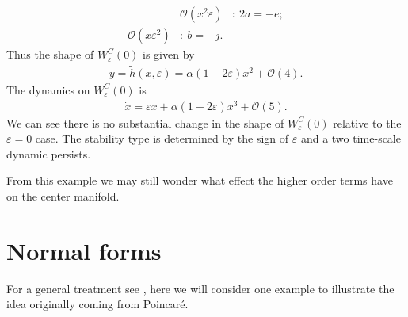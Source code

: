 \begin{ex}
\begin{subequations}
\begin{align}
		&\mathcal{O}(x^2\varepsilon)&:\ 2a=-e;\\
		\mathcal{O}(x\varepsilon^2)&:\ b=-j.
	\end{align}\end{subequations}
	Thus the shape of $W^{C}_{\varepsilon}(0)$ is given by 
	\begin{align}
		y = \tilde{h}(x,\varepsilon) = \alpha(1-2\varepsilon)x^2+ \mathcal{O}(4).
	\end{align}
	The dynamics on $W^{C}_{\varepsilon}(0)$ is
	\begin{align}
		\dot{x} = \varepsilon x + \alpha(1-2\varepsilon)x^3 + \mathcal{O}(5).
	\end{align}
	We can see there is no substantial change in the shape of $W^{C}_{\varepsilon}(0)$ relative to the $\varepsilon=0$ case. The stability type is determined by the sign of $\varepsilon$ and a two time-scale dynamic persists.	
\end{ex}
From this example we may still wonder what effect the higher order terms have on the center manifold.




\section{Normal forms}
For a general treatment see \cite{GuckenheimerHolmes}, here we will consider one example to illustrate the idea originally coming from Poincaré.

